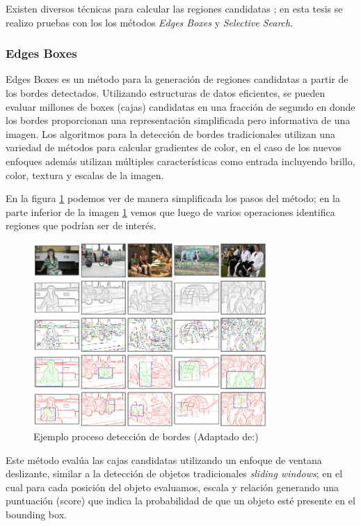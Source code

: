 Existen diversos técnicas para calcular las regiones candidatas \citep{proposal}; en esta tesis se realizo pruebas con los  los métodos \textit{Edges Boxes} y \textit{Selective Search}.

\subsubsection*{Edges Boxes} \label{sub:edgesboxes}

Edges Boxes  \citep{edges} es un método para la generación de regiones candidatas a partir de los bordes detectados. Utilizando estructuras de datos eficientes, se pueden evaluar millones de boxes (cajas) candidatas en una fracción de segundo en donde los bordes proporcionan una representación simplificada pero informativa de una imagen. Los algoritmos para la detección de bordes tradicionales utilizan una variedad de métodos para calcular gradientes de color, en el caso de los nuevos enfoques además utilizan múltiples características como entrada incluyendo brillo, color, textura y  escalas de la imagen. 

En la figura \ref{Fig: edges} podemos ver de manera simplificada los pasos del método;  en la parte inferior de la imagen \ref{Fig: edges} vemos que luego de varios operaciones identifica regiones que podrían ser de interés.

\begin{figure}[H]
 \centering
  \includegraphics[height=7cm,keepaspectratio=true,clip=true]{imagenes/MarcoTeorico/edges.png}
  \caption{Ejemplo proceso detección de bordes (Adaptado de:\citep{edges})}
	\label{Fig: edges}
\end{figure}

Este método evalúa las cajas candidatas utilizando un enfoque de ventana deslizante, similar a la detección de objetos tradicionales \textit{sliding windows}; en el cual para cada posición del objeto evaluamos, escala y relación generando una puntuación (score) que indica la probabilidad de que un objeto esté presente en el bounding box.


